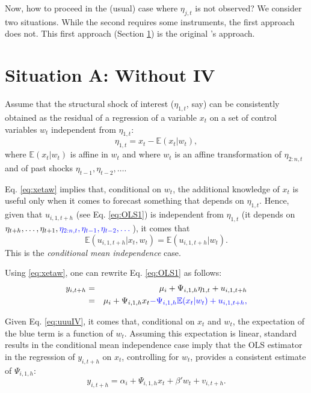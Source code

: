 \documentclass[
  12pt,
]{book}
\theoremstyle{definition}
\theoremstyle{definition}
\theoremstyle{definition}
\theoremstyle{definition}
\theoremstyle{remark}
\begin{document}
Now, how to proceed in the (usual) case where \(\eta_{j,t}\) is not observed? We consider two situations. While the second requires some instruments, the first approach does not. This first approach (Section \ref{LPIVww}) is the original \citet{Jorda_2005}'s approach.

\section{Situation A: Without IV}\label{LPIVww}

Assume that the structural shock of interest (\(\eta_{1,t}\), say) can be consistently obtained as the residual of a regression of a variable \(x_t\) on a set of control variables \(w_t\) independent from \(\eta_{1,t}\):
\begin{equation}
\eta_{1,t} = x_t - \mathbb{E}(x_t|w_t),\label{eq:xetaw}
\end{equation}
where \(\mathbb{E}(x_t|w_t)\) is affine in \(w_t\) and where \(w_t\) is an affine transformation of \(\eta_{2:n,t}\) and of past shocks \(\eta_{t-1},\eta_{t-2},\dots\).

Eq. \eqref{eq:xetaw} implies that, conditional on \(w_t\), the additional knowledge of \(x_t\) is useful only when it comes to forecast something that depends on \(\eta_{1,t}\). Hence, given that \(u_{i,1,t+h}\) (see Eq. \eqref{eq:OLS1}) is independent from \(\eta_{1,t}\) (it depends on \(\eta_{t+h},\dots,\eta_{t+1},\color{blue}{\eta_{2:n,t}},\eta_{t-1},\eta_{t-2},\dots\)), it comes that
\begin{equation}
\mathbb{E}(u_{i,1,t+h}|x_t,w_t)= \mathbb{E}(u_{i,1,t+h}|w_t).\label{eq:uuuIV}
\end{equation}
This is the \emph{conditional mean independence} case.

Using \eqref{eq:xetaw}, one can rewrite Eq. \eqref{eq:OLS1} as follows:
\begin{eqnarray*}
y_{i,t+h} &=& \mu_i + \Psi_{i,1,h}\eta_{1,t} + u_{i,1,t+h}\\
&=&  \mu_i + \Psi_{i,1,h}x_t  \color{blue}{-\Psi_{i,1,h}\mathbb{E}(x_t|w_t) + u_{i,1,t+h}},
\end{eqnarray*}

Given Eq. \eqref{eq:uuuIV}, it comes that, conditional on \(x_t\) and \(w_t\), the expectation of the blue term is a function of \(w_t\). Assuming this expectation is linear, standard results in the conditional mean independence case imply that the OLS estimator in the regression of \(y_{i,t+h}\) on \(x_t\), controlling for \(w_t\), provides a consistent estimate of \(\Psi_{i,1,h}\):
\begin{equation}
y_{i,t+h} = \alpha_i + \Psi_{i,1,h}x_t + \beta'w_t + v_{i,t+h}.
\end{equation}
\end{document}
